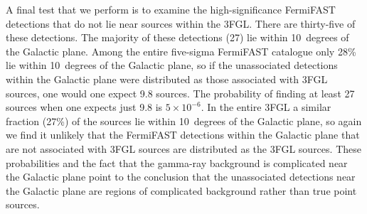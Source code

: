 \documentclass[useAMS,usenatbib]{mn2e}
\begin{document}
A final test that we perform is to examine the high-significance
FermiFAST detections that do not lie near sources within the 3FGL.
There are thirty-five of these detections.  The majority of these
detections (27) lie within 10~degrees of the Galactic plane.  Among
the entire five-sigma FermiFAST catalogue only 28\% lie within
10~degrees of the Galactic plane, so if the unassociated detections
within the Galactic plane were distributed as those associated with
3FGL sources, one would one expect 9.8 sources.  The probability of
finding at least 27 sources when one expects just 9.8 is $5\times
10^{-6}$.  In the entire 3FGL a similar fraction (27\%) of the sources
lie within 10~degrees of the Galactic plane, so again we find it
unlikely that the FermiFAST detections within the Galactic plane that
are not associated with 3FGL sources are distributed as the 3FGL
sources.  These probabilities and the fact that the gamma-ray
background is complicated near the Galactic plane point to the
conclusion that the unassociated detections near the Galactic plane are
regions of complicated background rather than true point sources.
\end{document}
